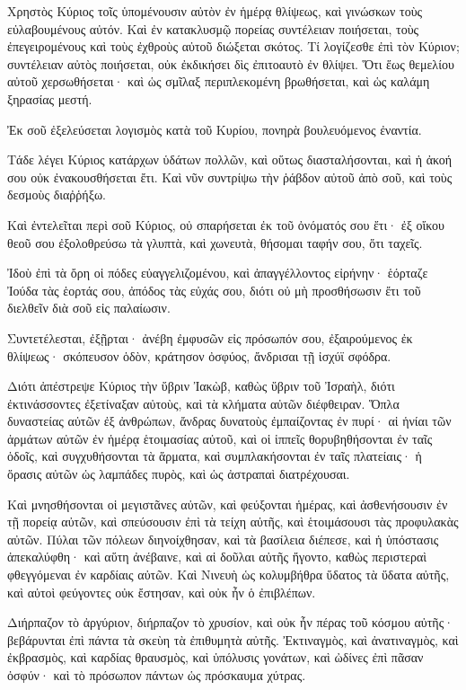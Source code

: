 \begin{spacing}{1.1}
\begin{multicols}{2}
Χρηστὸς Κύριος τοῖς ὑπομένουσιν αὐτὸν ἐν ἡμέρᾳ θλίψεως, καὶ γινώσκων τοὺς εὐλαβουμένους αὐτόν.
Καὶ ἐν κατακλυσμῷ πορείας συντέλειαν ποιήσεται, τοὺς ἐπεγειρομένους καὶ τοὺς ἐχθροὺς αὐτοῦ διώξεται σκότος.
Τί λογίζεσθε ἐπὶ τὸν Κύριον; συντέλειαν αὐτὸς ποιήσεται, οὐκ ἐκδικήσει δὶς ἐπιτοαυτὸ ἐν θλίψει.
Ὅτι ἕως θεμελίου αὐτοῦ χερσωθήσεται· καὶ ὡς σμῖλαξ περιπλεκομένη βρωθήσεται, καὶ ὡς καλάμη ξηρασίας μεστή.

Ἐκ σοῦ ἐξελεύσεται λογισμὸς κατὰ τοῦ Κυρίου, πονηρὰ βουλευόμενος ἐναντία.

Τάδε λέγει Κύριος κατάρχων ὑδάτων πολλῶν, καὶ οὕτως διασταλήσονται, καὶ ἡ ἀκοή σου οὐκ ἐνακουσθήσεται ἔτι.
Καὶ νῦν συντρίψω τὴν ῥάβδον αὐτοῦ ἀπὸ σοῦ, καὶ τοὺς δεσμοὺς διαῤῥήξω.

Καὶ ἐντελεῖται περὶ σοῦ Κύριος, οὐ σπαρήσεται ἐκ τοῦ ὀνόματός σου ἔτι· ἐξ οἴκου θεοῦ σου ἐξολοθρεύσω τὰ γλυπτὰ, καὶ χωνευτὰ, θήσομαι ταφήν σου, ὅτι ταχεῖς.

Ἰδοὺ ἐπὶ τὰ ὄρη οἱ πόδες εὐαγγελιζομένου, καὶ ἀπαγγέλλοντος εἰρήνην· ἑόρταζε Ἰούδα τὰς ἑορτάς σου, ἀπόδος τὰς εὐχάς σου, διότι οὐ μὴ προσθήσωσιν ἔτι τοῦ διελθεῖν διὰ σοῦ εἰς παλαίωσιν.

Συντετέλεσται, ἐξῇρται· ἀνέβη ἐμφυσῶν εἰς πρόσωπόν σου, ἐξαιρούμενος ἐκ θλίψεως· σκόπευσον ὁδὸν, κράτησον ὀσφύος, ἄνδρισαι τῇ ἰσχύϊ σφόδρα.

Διότι ἀπέστρεψε Κύριος τὴν ὕβριν Ἰακὼβ, καθὼς ὕβριν τοῦ Ἰσραὴλ, διότι ἐκτινάσσοντες ἐξετίναξαν αὐτοὺς, καὶ τὰ κλήματα αὐτῶν διέφθειραν.
Ὅπλα δυναστείας αὐτῶν ἐξ ἀνθρώπων, ἄνδρας δυνατοὺς ἐμπαίζοντας ἐν πυρί· αἱ ἡνίαι τῶν ἁρμάτων αὐτῶν ἐν ἡμέρᾳ ἑτοιμασίας αὐτοῦ, καὶ οἱ ἱππεῖς θορυβηθήσονται
ἐν ταῖς ὁδοῖς, καὶ συγχυθήσονται τὰ ἅρματα, καὶ συμπλακήσονται ἐν ταῖς πλατείαις· ἡ ὅρασις αὐτῶν ὡς λαμπάδες πυρὸς, καὶ ὡς ἀστραπαὶ διατρέχουσαι.

Καὶ μνησθήσονται οἱ μεγιστᾶνες αὐτῶν, καὶ φεύξονται ἡμέρας, καὶ ἀσθενήσουσιν ἐν τῇ πορείᾳ αὐτῶν, καὶ σπεύσουσιν ἐπὶ τὰ τείχη αὐτῆς, καὶ ἑτοιμάσουσι τὰς προφυλακὰς αὐτῶν.
Πύλαι τῶν πόλεων διηνοίχθησαν, καὶ τὰ βασίλεια διέπεσε,
καὶ ἡ ὑπόστασις ἀπεκαλύφθη· καὶ αὕτη ἀνέβαινε, καὶ αἱ δοῦλαι αὐτῆς ἤγοντο, καθὼς περιστεραὶ φθεγγόμεναι ἐν καρδίαις αὐτῶν.
Καὶ Νινευὴ ὡς κολυμβήθρα ὕδατος τὰ ὕδατα αὐτῆς, καὶ αὐτοὶ φεύγοντες οὐκ ἔστησαν, καὶ οὐκ ἦν ὁ ἐπιβλέπων.

Διήρπαζον τὸ ἀργύριον, διήρπαζον τὸ χρυσίον, καὶ οὐκ ἦν πέρας τοῦ κόσμου αὐτῆς· βεβάρυνται ἐπὶ πάντα τὰ σκεὺη τὰ ἐπιθυμητὰ αὐτῆς.
Ἐκτιναγμὸς, καὶ ἀνατιναγμὸς, καὶ ἐκβρασμὸς, καὶ καρδίας θραυσμὸς, καὶ ὑπόλυσις γονάτων, καὶ ὠδίνες ἐπὶ πᾶσαν ὀσφύν· καὶ τὸ πρόσωπον πάντων ὡς πρόσκαυμα χύτρας.


\end{multicols}
\end{spacing}
